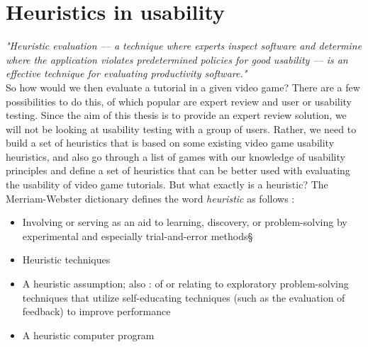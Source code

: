 \section{Heuristics in usability}

\textit{"Heuristic evaluation –-- a technique where experts inspect software and determine where the application violates predetermined policies for good usability –-- is an effective technique for evaluating productivity software."} \cite{Livingston2010} \\

So how would we then evaluate a tutorial in a given video game? There are a few possibilities to do this, of which popular are expert review and user or usability testing. Since the aim of this thesis is to provide an expert review solution, we will not be looking at usability testing with a group of users. Rather, we need to build a set of heuristics that is based on some existing video game usability heuristics, and also go through a list of games with our knowledge of usability principles and define a set of heuristics that can be better used with evaluating the usability of video game tutorials. But what exactly is a heuristic? The Merriam-Webster dictionary defines the word \textit{heuristic} as follows \cite{merriam2007}: 

\begin{itemize}
	\item Involving or serving as an aid to learning, discovery, or problem-solving by experimental and especially trial-and-error methods§ 
	\item Heuristic techniques 
	\item A heuristic assumption; also :  of or relating to exploratory problem-solving techniques that utilize self-educating techniques (such as the evaluation of feedback) to improve performance 
	\item A heuristic computer program 
	
\end{itemize}

